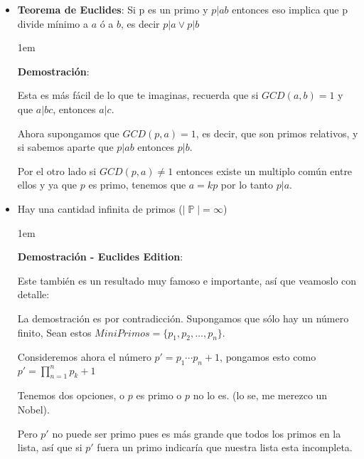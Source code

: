 \documentclass[12pt, fleqn]{report}                             %
\newenvironment{SmallIndentation}[1][0.75em]                    %
    {\begin{adjustwidth}{#1}{}\begin{footnotesize}}                 %
    {\end{footnotesize}\end{adjustwidth}}                           %
\DeclareMathOperator \Naturals  {\mathbb{N}}                     %
\DeclareMathOperator \Primes    {\mathbb{P}}                     %
\begin{document}
        \begin{itemize}

            \item \textbf{Teorema de Euclides}:
                Si p es un primo y $p|ab$ entonces eso implica que p divide mínimo
                a $a$ ó a $b$, es decir $p|a \lor p|b$

                \begin{SmallIndentation}[1em]
                    \textbf{Demostración}:

                    Esta es más fácil de lo que te imaginas, recuerda que si
                    $GCD(a,b) = 1$ y que $a|bc$, entonces $a|c$.

                    Ahora supongamos que $GCD(p,a) = 1$, es decir, que son primos
                    relativos, y si sabemos aparte que $p|ab$ entonces $p|b$.

                    Por el otro lado si $GCD(p, a) \neq 1$ entonces existe un multiplo
                    común entre ellos y ya que $p$ es primo, tenemos que $a=kp$ por lo
                    tanto $p|a$.

                \end{SmallIndentation}


            \item Hay una cantidad infinita de primos ($|\Primes| = \infty$)

                \begin{SmallIndentation}[1em]
                    \textbf{Demostración - Euclides Edition}:

                    Este también es un resultado muy famoso e importante, así
                    que veamoslo con detalle:

                    La demostración es por contradicción.
                    Supongamos que sólo hay un número finito, Sean estos 
                    $MiniPrimos = \{ p_1, p_2, \dots, p_n\}$.

                    Consideremos ahora el número $p'=p_1 \cdots p_n + 1$,
                    pongamos esto como $p' = \prod_{n=1}^{n} p_k +1$

                    Tenemos dos opciones, o $p$ es primo o $p$ no lo es.
                    (lo se, me merezco un Nobel).

                    Pero $p'$ no puede ser primo pues es más grande que
                    todos los primos en la lista, así que si $p'$ fuera
                    un primo indicaría que nuestra lista esta incompleta.


\end{SmallIndentation}
\end{itemize}
\end{document}
